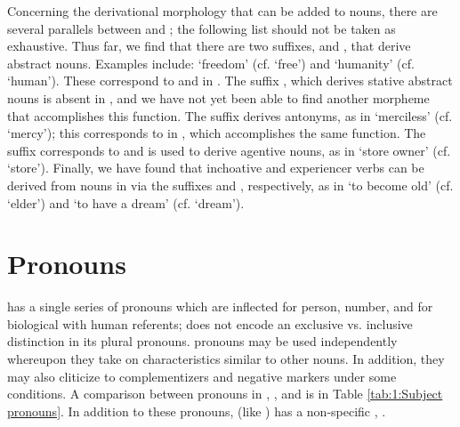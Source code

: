 \documentclass[output=paper]{LSP/langsci}
\begin{document}
 Concerning the derivational morphology that can be added to nouns, there are several parallels between  and ; the following list should not be taken as exhaustive. Thus far, we find that there are two  suffixes, \mbox{} and , that derive abstract nouns. Examples include:  `freedom' (cf.  `free') and  `humanity' (cf.  `human'). These correspond to \mbox{} and  in . The  suffix , which derives stative abstract nouns is absent in , and we have not yet been able to find another morpheme that accomplishes this function. The  suffix  derives antonyms, as in  `merciless' (cf.  `mercy'); this corresponds to  in , which accomplishes the same function. The  suffix  corresponds to   and is used to derive agentive nouns, as in  `store owner' (cf.  `store'). Finally, we have found that inchoative and experiencer verbs can be derived from nouns in  via the suffixes  and , respectively, as in  `to become old' (cf.  `elder') and  `to have a dream' (cf.  `dream'). 
 
 \section{Pronouns}
 
  has a single series of  pronouns which are inflected for person, number, and for biological  with human referents;  does not encode an exclusive vs. inclusive distinction in its  plural  pronouns.   pronouns may be used independently whereupon they take on characteristics similar to other nouns. In addition, they may also cliticize to complementizers and negative markers under some conditions. A comparison between  pronouns in , , and  is in Table \ref{tab:1:Subject pronouns}. In addition to these  pronouns,  (like ) has a non-specific , .
 
\end{document}
